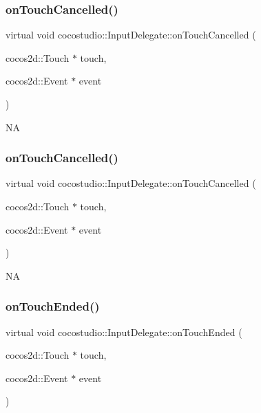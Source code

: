 \subsubsection{\texorpdfstring{on\+Touch\+Cancelled()}{onTouchCancelled()}\hspace{0.1cm}{\footnotesize\ttfamily [1/2]}}
{\footnotesize\ttfamily virtual void cocostudio\+::\+Input\+Delegate\+::on\+Touch\+Cancelled (\begin{DoxyParamCaption}\item[{cocos2d\+::\+Touch $\ast$}]{touch,  }\item[{cocos2d\+::\+Event $\ast$}]{event }\end{DoxyParamCaption})\hspace{0.3cm}{\ttfamily [virtual]}}

NA \mbox{\label{classcocostudio_1_1InputDelegate_aa82e9e391c01c1349f5e7c7d0745b6b5}} 
\subsubsection{\texorpdfstring{on\+Touch\+Cancelled()}{onTouchCancelled()}\hspace{0.1cm}{\footnotesize\ttfamily [2/2]}}
{\footnotesize\ttfamily virtual void cocostudio\+::\+Input\+Delegate\+::on\+Touch\+Cancelled (\begin{DoxyParamCaption}\item[{cocos2d\+::\+Touch $\ast$}]{touch,  }\item[{cocos2d\+::\+Event $\ast$}]{event }\end{DoxyParamCaption})\hspace{0.3cm}{\ttfamily [virtual]}}

NA \mbox{\label{classcocostudio_1_1InputDelegate_a645cfb7944ef4878e6de5904d48bf310}} 
\subsubsection{\texorpdfstring{on\+Touch\+Ended()}{onTouchEnded()}\hspace{0.1cm}{\footnotesize\ttfamily [1/2]}}
{\footnotesize\ttfamily virtual void cocostudio\+::\+Input\+Delegate\+::on\+Touch\+Ended (\begin{DoxyParamCaption}\item[{cocos2d\+::\+Touch $\ast$}]{touch,  }\item[{cocos2d\+::\+Event $\ast$}]{event }\end{DoxyParamCaption})\hspace{0.3cm}{\ttfamily [virtual]}}

